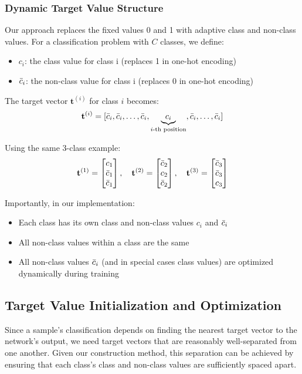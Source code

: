 \documentclass[12pt,fleqn,a4paper]{article}
\begin{document}
\subsubsection{Dynamic Target Value Structure}
Our approach replaces the fixed values 0 and 1 with adaptive class and non-class values. For a classification problem with $C$ classes, we define:

\begin{itemize}
\item $c_i$: the class value for class i (replaces 1 in one-hot encoding)
\item $\Bar{c}_i$: the non-class value for class i (replaces 0 in one-hot encoding)
\end{itemize}

The target vector $\mathbf{t}^{(i)}$ for class $i$ becomes:
$$\mathbf{t}^{(i)} = [\Bar{c}_i, \Bar{c}_i, \ldots, \Bar{c}_i, \underbrace{c_i}_{i\text{-th position}}, \Bar{c}_i, \ldots, \Bar{c}_i]$$

Using the same 3-class example:
$$\mathbf{t}^{(1)} = \begin{bmatrix} c_1 \\ \Bar{c}_1 \\ \Bar{c}_1 \end{bmatrix}, \quad 
\mathbf{t}^{(2)} = \begin{bmatrix} \Bar{c}_2 \\ c_2 \\ \Bar{c}_2 \end{bmatrix}, \quad 
\mathbf{t}^{(3)} = \begin{bmatrix} \Bar{c}_3 \\ \Bar{c}_3 \\ c_3 \end{bmatrix}$$

Importantly, in our implementation:
\begin{itemize}
\item Each class has its own class and non-class values $c_i$ and $\Bar{c}_i$
\item All non-class values within a class are the same
\item All non-class values $\Bar{c}_i$ (and in special cases class values) are optimized dynamically during training
\end{itemize}

\subsection{Target Value Initialization and Optimization}
Since a sample's classification depends on finding the nearest target vector to the network's output, we need target vectors that are reasonably well-separated from one another. Given our construction method, this separation can be achieved by ensuring that each class's class and non-class values are sufficiently spaced apart.
\end{document}
